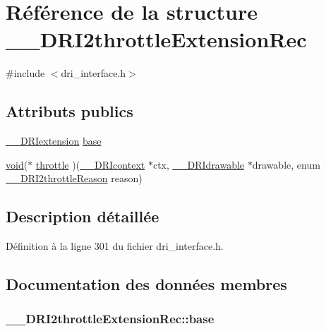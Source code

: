 \hypertarget{struct_____d_r_i2throttle_extension_rec}{\section{Référence de la structure \-\_\-\-\_\-\-D\-R\-I2throttle\-Extension\-Rec}
\label{struct_____d_r_i2throttle_extension_rec}
}


{\ttfamily \#include $<$dri\-\_\-interface.\-h$>$}

\subsection*{Attributs publics}
\begin{DoxyCompactItemize}
\item 
\hyperlink{dri__interface_8h_a4e0a61c8ece00d2b2c6792a9a1b55385}{\-\_\-\-\_\-\-D\-R\-Iextension} \hyperlink{struct_____d_r_i2throttle_extension_rec_a17a537fe633d9b6ac1194290382a76b3}{base}
\item 
\hyperlink{glu_8h_a4292190e3f1f6b373a760c7d9316ad3c}{void}($\ast$ \hyperlink{struct_____d_r_i2throttle_extension_rec_a831ccfd6396ecba525b6f0b4c1995b8d}{throttle} )(\hyperlink{dri__interface_8h_a3fd295cba82b5a3d79f1ee7e12bfb908}{\-\_\-\-\_\-\-D\-R\-Icontext} $\ast$ctx, \hyperlink{dri__interface_8h_a5bfb832a0a08208d95b3bbef439d2262}{\-\_\-\-\_\-\-D\-R\-Idrawable} $\ast$drawable, enum \hyperlink{dri__interface_8h_a195f4ef9181a99d4aae51c5ba5ee32aa}{\-\_\-\-\_\-\-D\-R\-I2throttle\-Reason} reason)
\end{DoxyCompactItemize}


\subsection{Description détaillée}


Définition à la ligne 301 du fichier dri\-\_\-interface.\-h.



\subsection{Documentation des données membres}
\hypertarget{struct_____d_r_i2throttle_extension_rec_a17a537fe633d9b6ac1194290382a76b3}{
\subsubsection[{base}]{ \-\_\-\-\_\-\-D\-R\-I2throttle\-Extension\-Rec\-::base}}\label{struct_____d_r_i2throttle_extension_rec_a17a537fe633d9b6ac1194290382a76b3}


